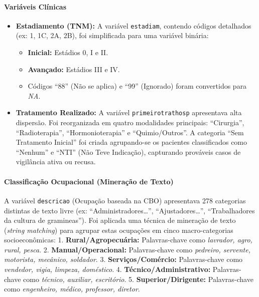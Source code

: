 \documentclass[
]{article}
\providecommand{\tightlist}{%
  \setlength{\itemsep}{0pt}\setlength{\parskip}{0pt}}
\begin{document}
\paragraph{Variáveis Clínicas}\label{variuxe1veis-cluxednicas}

\begin{itemize}
\tightlist
\item
  \textbf{Estadiamento (TNM):} A variável \texttt{estadiam}, contendo
  códigos detalhados (ex: 1, 1C, 2A, 2B), foi simplificada para uma
  variável binária:

  \begin{itemize}
  \tightlist
  \item
    \textbf{Inicial:} Estádios 0, I e II.
  \item
    \textbf{Avançado:} Estádios III e IV.
  \item
    Códigos ``88'' (Não se aplica) e ``99'' (Ignorado) foram convertidos
    para \emph{NA}.
  \end{itemize}
\item
  \textbf{Tratamento Realizado:} A variável \texttt{primeirotrathosp}
  apresentava alta dispersão. Foi reorganizada em quatro modalidades
  principais: ``Cirurgia'', ``Radioterapia'', ``Hormonioterapia'' e
  ``Quimio/Outros''. A categoria ``Sem Tratamento Inicial'' foi criada
  agrupando-se os pacientes classificados como ``Nenhum'' e ``NTI'' (Não
  Teve Indicação), capturando prováveis casos de vigilância ativa ou
  recusa.
\end{itemize}

\paragraph{Classificação Ocupacional (Mineração de
Texto)}\label{classificauxe7uxe3o-ocupacional-minerauxe7uxe3o-de-texto}

A variável \texttt{descricao} (Ocupação baseada na CBO) apresentava 278
categorias distintas de texto livre (ex: ``Administradores\ldots{}'',
``Ajustadores\ldots{}'', ``Trabalhadores da cultura de gramineas''). Foi
aplicada uma técnica de mineração de texto (\emph{string matching}) para
agrupar estas ocupações em cinco macro-categorias socioeconômicas: 1.
\textbf{Rural/Agropecuária:} Palavras-chave como \emph{lavrador, agro,
rural, pesca}. 2. \textbf{Manual/Operacional:} Palavras-chave como
\emph{pedreiro, servente, motorista, mecânico, soldador}. 3.
\textbf{Serviços/Comércio:} Palavras-chave como \emph{vendedor, vigia,
limpeza, doméstico}. 4. \textbf{Técnico/Administrativo:} Palavras-chave
como \emph{técnico, auxiliar, escritório}. 5.
\textbf{Superior/Dirigente:} Palavras-chave como \emph{engenheiro,
médico, professor, diretor}.
\end{document}
